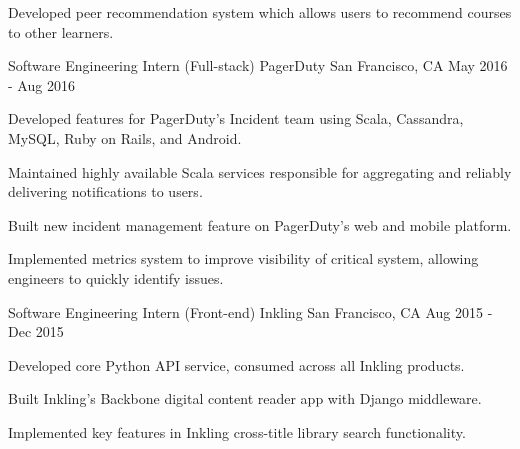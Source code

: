 \begin{cventries}
{\begin{cvitems}
      \item {Developed peer recommendation system which allows users to recommend courses to other learners.}
      \end{cvitems}
    }
  \cventry
  {Software Engineering Intern (Full-stack)} %
    {PagerDuty} %
    {San Francisco, CA} %
    {May 2016 - Aug 2016} %
    {
      \begin{cvitems} %
      \item {Developed features for PagerDuty's Incident team using Scala, Cassandra, MySQL, Ruby on Rails, and Android.}
      \item {Maintained highly available Scala services responsible for aggregating and reliably delivering notifications to users.}
      \item {Built new incident management feature on PagerDuty's web and mobile platform.}
      \item {Implemented metrics system to improve visibility of critical system, allowing engineers to quickly identify issues. }
      \end{cvitems}
    }

  \cventry
  {Software Engineering Intern (Front-end)} %
    {Inkling} %
    {San Francisco, CA} %
    {Aug 2015 - Dec 2015} %
    {
      \begin{cvitems} %
      \item {Developed core Python API service, consumed across all Inkling products.}
      \item {Built Inkling's Backbone digital content reader app with Django middleware.}
      \item {Implemented key features in Inkling cross-title library search functionality.}
      \end{cvitems}
    }


\end{cventries}
